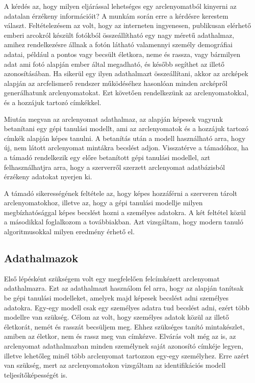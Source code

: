 A kérdés az, hogy milyen eljárással lehetséges egy arclenyomatból kinyerni az adatalan érzékeny információit? A munkám során erre a kérdésre kerestem választ. Feltételezésem az volt, hogy az interneten ingyenesen, publikusan elérhető emberi arcokról készült fotókból összeállítható egy nagy méretű adathalmaz, amihez rendelkezésre állnak a fotón látható valamennyi személy demográfiai adatai, például a pontos vagy becsült életkora, neme és rassza, vagy bármilyen adat ami fotó alapján ember által megadható, és később segíthet az illető azonosításában. Ha sikerül egy ilyen adathalmazt összeállítani, akkor az arcképek alapján az arcfelismerő rendszer működéséhez hasonlóan minden arcképről generálhatunk arclenyomatokat. Ezt követően rendelkezünk az arclenyomatokkal, és a hozzájuk tartozó címkékkel.

Miután megvan az arclenyomat adathalmaz, az alapján képesek vagyunk betanítani egy gépi tanulási modellt, ami az arclenyomatok és a hozzájuk tartozó címkék alapján képes tanulni. A betanítás után a modell használható arra, hogy új, nem látott arclenyomat mintákra becslést adjon. Visszatérve a támadóhoz, ha a támadó rendelkezik egy előre betanított gépi tanulási modellel, azt felhasználhatjra arra, hogy a szerverről szerzett arclenyomat adatbázisból érzékeny adatokat nyerjen ki. 

A támadó sikerességének feltétele az, hogy képes hozzáférni a szerveren tárolt arclenyomatokhoz, illetve az, hogy a gépi tanulási modellje milyen megbízhatósággal képes becslést hozni a személyes adatokra. A két feltétel közül a másodikkal foglalkozom a továbbiakban. Azt vizsgáltam, hogy modern tanuló algoritmusokkal milyen eredmény érhető el.

\subsection{Adathalmazok}  %

Első lépésként szükségem volt egy megfelelően felcímkézett arclenyomat adathalmazra. Ezt az adathalmazt használom fel arra, hogy az alapján tanítsak be gépi tanulási modelleket, amelyek majd képesek becslést adni személyes adatokra. Egy-egy modell csak egy személyes adatra tud becslést adni, ezért több modellre van szükség. Célom az volt, hogy személyes adatok közül az illető életkorát, nemét és rasszát becsüljem meg. Ehhez szükséges tanító mintakészlet, amiben az életkor, nem és rassz meg van címkézve. Elvárás volt még az is, az arclenyomat adathalmazban minden személynek saját azonosító címkéje legyen, illetve lehetőleg minél több arclenyomat tartozzon egy-egy személyhez. Erre azért van szükség, mert az arclenyomatokon vizsgáltam az identifikációs modell teljesítőképességét is. 

